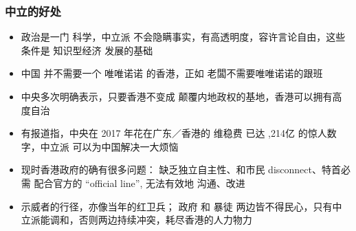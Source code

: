 \documentclass[10pt]{beamer}
\newcommand{\emp}[1]{{\color{blue}#1}}
\begin{document}
\begin{frame}
\frametitle{中立的好处}
\begin{itemize}
	\item 政治是一门 \emp{科学}，中立派 不会隐瞒事实，有高透明度，容许言论自由，这些条件是 \emp{知识型经济} 发展的基础
	
	\item 中国 并不需要一个 唯唯诺诺 的香港，正如 老闆不需要唯唯诺诺的跟班
	
	\item 中央多次明确表示，只要香港不变成 颠覆内地政权的基地，香港可以拥有高度自治

	\item 有报道指，中央在 2017 年花在广东／香港的 维稳费 已达 ,214亿 的惊人数字，中立派 可以为中国解决一大烦恼

	\item 现时香港政府的确有很多问题： 缺乏独立自主性、和市民 disconnect、特首必需 配合官方的 ``official line'', 无法有效地 沟通、改进

	\item 示威者的行径，亦像当年的红卫兵； 政府 和 暴徒 两边皆不得民心，只有中立派能调和，否则两边持续冲突，耗尽香港的人力物力

\end{itemize}
\end{frame}
\end{document}
